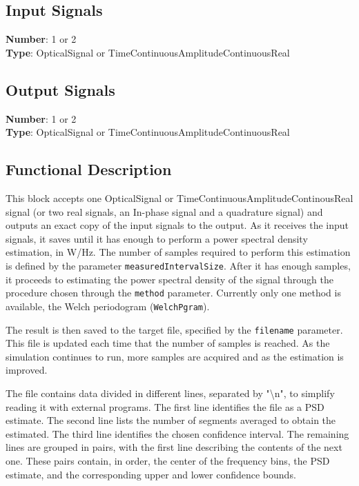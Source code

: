 \begin{refsection}
\subsection*{Input Signals}

\textbf{Number}: 1 or 2\\
\textbf{Type}: OpticalSignal or TimeContinuousAmplitudeContinuousReal

\subsection*{Output Signals}

\textbf{Number}: 1 or 2\\
\textbf{Type}: OpticalSignal or TimeContinuousAmplitudeContinuousReal

\subsection*{Functional Description}
This block accepts one OpticalSignal or TimeContinuousAmplitudeContinousReal signal
(or two real signals, an In-phase signal and a quadrature signal) and outputs
an exact copy of the input signals to the output. As it receives the input
signals, it saves until it has enough to perform a power spectral density
estimation, in W/Hz. The number of samples required to perform this estimation is defined
by the parameter \texttt{measuredIntervalSize}. After it has enough samples, it
proceeds to estimating the power spectral density of the signal through the
procedure chosen through the \texttt{method} parameter. Currently only one
method is available, the Welch periodogram (\texttt{WelchPgram}).

The result is then saved to the target file, specified by the \texttt{filename}
parameter. This file is updated each time that the number of samples is reached.
As the simulation continues to run, more samples are acquired and as the estimation is improved.

The file contains data divided in different lines, separated by "\textbackslash n", to simplify reading it with
external programs. The first line identifies the file as a PSD estimate.
The second line lists the number of segments averaged to obtain the estimated.
The third line identifies the chosen confidence interval.
The remaining lines are grouped in pairs, with the first line describing the
contents of the next one. These pairs contain, in order, the center of the
frequency bins, the PSD estimate, and the corresponding upper and lower
confidence bounds.


\end{refsection}
